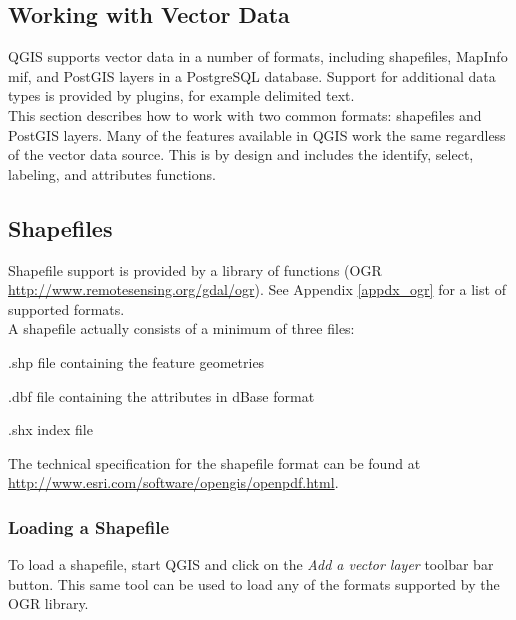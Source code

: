 \documentclass[10pt,english]{article}
\begin{document}
\begin{onehalfspace}
\section{Working with Vector Data}
QGIS supports vector data in a number of formats, including shapefiles,
MapInfo mif, and PostGIS layers in a PostgreSQL database. Support for
additional data types is provided by plugins, for example delimited text.\\

This section describes how to work with two common formats: shapefiles and
PostGIS layers. Many of the features available in QGIS work the same regardless of the 
vector data source. This is by design and includes the identify, select, labeling, and attributes functions.

\subsection{Shapefiles}
Shapefile support is provided by a library of functions (OGR \url{http://www.remotesensing.org/gdal/ogr}). See Appendix \ref{appdx_ogr} for a list of supported formats.\\

A shapefile actually consists of a minimum of three files:
\begin{compactenum}
\item .shp file containing the feature geometries
\item .dbf file containing the attributes in dBase format
\item .shx index file
\end{compactenum}
The technical specification for the shapefile format can be found at\\ \url{http://www.esri.com/software/opengis/openpdf.html}.
\subsubsection{Loading a Shapefile}
To load a shapefile, start QGIS and click on the \textit{Add a vector layer} toolbar bar button. This same tool can be used to load any of the formats supported by the OGR library.


\end{onehalfspace}
\end{document}
